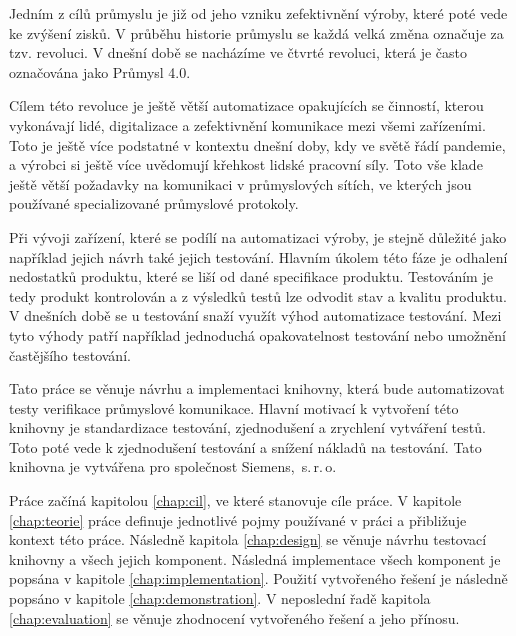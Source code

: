 \begin{introduction}

Jedním z cílů průmyslu je již od jeho vzniku zefektivnění výroby, které poté vede ke zvýšení zisků. V průběhu historie průmyslu se každá velká změna označuje za tzv. revoluci. V dnešní době se nacházíme ve čtvrté revoluci, která je často označována jako Průmysl 4.0. 

Cílem této revoluce je ještě větší automatizace opakujících se činností, kterou vykonávají lidé, digitalizace a zefektivnění komunikace mezi všemi zařízeními. Toto je ještě více podstatné v kontextu dnešní doby, kdy ve světě řádí pandemie, a výrobci si ještě více uvědomují křehkost lidské pracovní síly. Toto vše klade ještě větší požadavky na komunikaci v průmyslových sítích, ve kterých jsou používané specializované průmyslové protokoly. 

Při vývoji zařízení, které se podílí na automatizaci výroby, je stejně důležité jako například jejich návrh také jejich testování. Hlavním úkolem této fáze je odhalení nedostatků produktu, které se liší od dané specifikace produktu. Testováním je tedy produkt kontrolován a z výsledků testů lze odvodit stav a kvalitu produktu. V dnešních době se u testování snaží využít výhod automatizace testování. Mezi tyto výhody patří například jednoduchá opakovatelnost testování nebo umožnění častějšího testování. 

Tato práce se věnuje návrhu a implementaci knihovny, která bude automatizovat testy verifikace průmyslové komunikace. Hlavní motivací k vytvoření této knihovny je standardizace testování, zjednodušení a zrychlení vytváření testů. Toto poté vede k zjednodušení testování a snížení nákladů na testování. Tato knihovna je vytvářena pro společnost Siemens,~s.\,{}r.\,{}o.

Práce začíná kapitolou \ref{chap:cil}, ve které stanovuje cíle práce. V kapitole \ref{chap:teorie} práce definuje jednotlivé pojmy používané v práci a přibližuje kontext této práce. Následně kapitola \ref{chap:design} se věnuje návrhu testovací knihovny a všech jejich komponent. Následná implementace všech komponent je popsána v kapitole \ref{chap:implementation}. Použití vytvořeného řešení je následně popsáno v kapitole \ref{chap:demonstration}. V neposlední řadě kapitola \ref{chap:evaluation} se věnuje zhodnocení vytvořeného řešení a jeho přínosu.
\end{introduction}